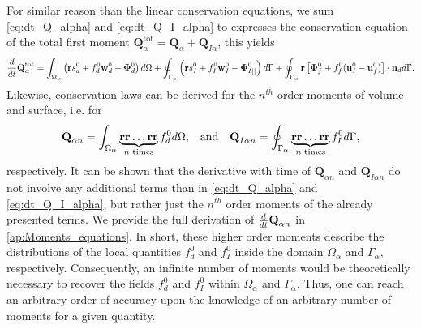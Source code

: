 For similar reason than the linear conservation equations, we sum \ref{eq:dt_Q_alpha} and \ref{eq:dt_Q_I_alpha} to expresses the conservation equation of the total first moment $\textbf{Q}_\alpha^\text{tot} = \textbf{Q}_\alpha + \textbf{Q}_{I\alpha}$, this yields 
\begin{multline}
    \frac{d}{dt} {\textbf{Q}_\alpha^\text{tot}}
    = \int_{\Omega_\alpha}  \left(
        \textbf{r} s_d^0         
        + f_d^0  \textbf{w}_d^0 
        - \mathbf{\Phi}_d^0
    \right)  d\Omega
    + \oint_{\Gamma_\alpha}  \left(
        \textbf{r}s_I^0
        + f_I^0 \textbf{w}_I^0
        - \mathbf{\Phi}_{I||}^0
    \right)  d\Gamma
    + \oint_{\Gamma_\alpha}  \textbf{r} \left[
        \mathbf{\Phi}_f^0
        + f_f^0 (\textbf{u}_I^0-\textbf{u}_f^0)
    \right]\cdot \textbf{n}_d   d\Gamma. 
    \label{eq:dt_Q_alpha_tot}
\end{multline}
Likewise, conservation laws can be derived for the $n^{th}$ order moments of volume and surface, i.e. for
\begin{align}
    \textbf{Q}_{\alpha n}
    = \int_{\Omega_\alpha} 
         \underbrace{\textbf{rr}\ldots \textbf{rr}}_{n\text{ times}}
        f_d^0  d\Omega,
        && \text{and} &&
    \textbf{Q}_{I\alpha n}
    = \oint_{\Gamma_\alpha} 
         \underbrace{\textbf{rr}\ldots \textbf{rr}}_{n\text{ times}}
    f_I^0  d\Gamma,
    \label{eq:Q_n_definition}
\end{align} 
respectively. 
It can be shown that the derivative with time of $\textbf{Q}_{\alpha n}$ and $\textbf{Q}_{I\alpha n}$ do not involve any additional terms than in \ref{eq:dt_Q_alpha} and \ref{eq:dt_Q_I_alpha}, but rather just the $n^{th}$ order moments of the already presented terms.
We provide the full derivation of $\frac{d}{dt}{ \textbf{Q}_{\alpha n}}$ in \ref{ap:Moments_equations}.
In short, these higher order moments describe the distributions of the local quantities $f_d^0$ and $f_I^0$ inside the domain $\Omega_\alpha$ and $\Gamma_\alpha$, respectively.
Consequently, an infinite number of moments would be theoretically necessary to recover the fields $f_d^0$ and $f_I^0$ within $\Omega_\alpha$ and $\Gamma_\alpha$. 
Thus, one can reach an arbitrary order of accuracy upon the knowledge of an arbitrary number of moments for a given quantity.  
